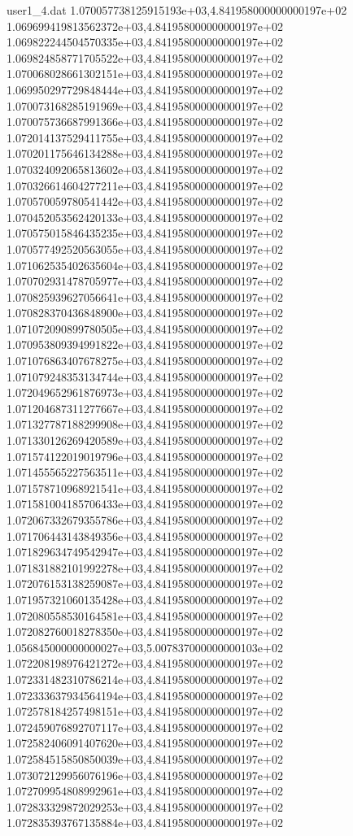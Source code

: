 \begin{filecontents}{user1_4.dat}
1.070057738125915193e+03,4.841958000000000197e+02
1.069699419813562372e+03,4.841958000000000197e+02
1.069822244504570335e+03,4.841958000000000197e+02
1.069824858771705522e+03,4.841958000000000197e+02
1.070068028661302151e+03,4.841958000000000197e+02
1.069950297729848444e+03,4.841958000000000197e+02
1.070073168285191969e+03,4.841958000000000197e+02
1.070075736687991366e+03,4.841958000000000197e+02
1.072014137529411755e+03,4.841958000000000197e+02
1.070201175646134288e+03,4.841958000000000197e+02
1.070324092065813602e+03,4.841958000000000197e+02
1.070326614604277211e+03,4.841958000000000197e+02
1.070570059780541442e+03,4.841958000000000197e+02
1.070452053562420133e+03,4.841958000000000197e+02
1.070575015846435235e+03,4.841958000000000197e+02
1.070577492520563055e+03,4.841958000000000197e+02
1.071062535402635604e+03,4.841958000000000197e+02
1.070702931478705977e+03,4.841958000000000197e+02
1.070825939627056641e+03,4.841958000000000197e+02
1.070828370436848900e+03,4.841958000000000197e+02
1.071072090899780505e+03,4.841958000000000197e+02
1.070953809394991822e+03,4.841958000000000197e+02
1.071076863407678275e+03,4.841958000000000197e+02
1.071079248353134744e+03,4.841958000000000197e+02
1.072049652961876973e+03,4.841958000000000197e+02
1.071204687311277667e+03,4.841958000000000197e+02
1.071327787188299908e+03,4.841958000000000197e+02
1.071330126269420589e+03,4.841958000000000197e+02
1.071574122019019796e+03,4.841958000000000197e+02
1.071455565227563511e+03,4.841958000000000197e+02
1.071578710968921541e+03,4.841958000000000197e+02
1.071581004185706433e+03,4.841958000000000197e+02
1.072067332679355786e+03,4.841958000000000197e+02
1.071706443143849356e+03,4.841958000000000197e+02
1.071829634749542947e+03,4.841958000000000197e+02
1.071831882101992278e+03,4.841958000000000197e+02
1.072076153138259087e+03,4.841958000000000197e+02
1.071957321060135428e+03,4.841958000000000197e+02
1.072080558530164581e+03,4.841958000000000197e+02
1.072082760018278350e+03,4.841958000000000197e+02
1.056845000000000027e+03,5.007837000000000103e+02
1.072208198976421272e+03,4.841958000000000197e+02
1.072331482310786214e+03,4.841958000000000197e+02
1.072333637934564194e+03,4.841958000000000197e+02
1.072578184257498151e+03,4.841958000000000197e+02
1.072459076892707117e+03,4.841958000000000197e+02
1.072582406091407620e+03,4.841958000000000197e+02
1.072584515850850039e+03,4.841958000000000197e+02
1.073072129956076196e+03,4.841958000000000197e+02
1.072709954808992961e+03,4.841958000000000197e+02
1.072833329872029253e+03,4.841958000000000197e+02
1.072835393767135884e+03,4.841958000000000197e+02

\end{filecontents}
